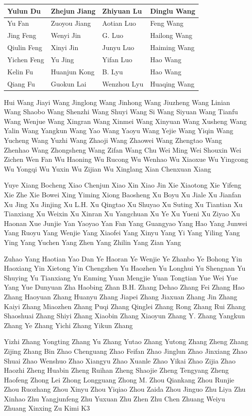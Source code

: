 {\begin{longtable}[]{@{}|l|l|l|l|@{}}
\hline
Yulun Du & Zhejun Jiang & Zhiyuan Lu & Dinglu Wang \\
\hline
Yu Fan & Zuoyou Jiang & Aotian Luo & Feng Wang \\
\hline
Jing Feng & Wenyi Jin & G. Luo & Hailong Wang \\
\hline
Qiulin Feng & Xinyi Jin & Junyu Luo & Haiming Wang \\
\hline
Yichen Feng & Yu Jing & Yifan Luo & Hao Wang \\
\hline
Kelin Fu & Huanjun Kong & B. Lyu & Hao Wang \\
\hline
Qiang Fu & Guokun Lai & Wenzhou Lyu & Huaqing Wang \\
\hline
\end{longtable}
}

Hui Wang Jiayi Wang Jinglong Wang Jinhong Wang Jiuzheng Wang Linian Wang
Shaobo Wang Shenzhi Wang Shuyi Wang Si Wang Siyuan Wang Tianfu Wang
Wenjue Wang Xingran Wang Xinmei Wang Xinyuan Wang Xusheng Wang Yalin
Wang Yangkun Wang Yao Wang Yaoyu Wang Yejie Wang Yiqin Wang Yucheng Wang
Yuzhi Wang Zhaoji Wang Zhaowei Wang Zhengtao Wang Zhenhao Wang
Zhongsheng Wang Zifan Wang Chu Wei Ming Wei Shouxin Wei Zichen Wen Fan
Wu Haoning Wu Rucong Wu Wenhao Wu Xiaoxue Wu Yingcong Wu Yongqi Wu Yuxin
Wu Zijian Wu Xinglang Xian Chenxuan Xiang

Yuye Xiang Bocheng Xiao Chenjun Xiao Xin Xiao Jin Xie Xiaotong Xie
Yifeng Xie Zhe Xie Bowei Xing Yiming Xiong Baosheng Xu Boyu Xu Jiale Xu
Jianfan Xu Jing Xu Jinjing Xu L.H. Xu Qingtao Xu Shuyao Xu Suting Xu
Tiantian Xu Tianxiang Xu Weixin Xu Xinran Xu Yangchuan Xu Ye Xu Yueni Xu
Ziyao Xu Haonan Xue Junjie Yan Yaoyao Yan Fan Yang Guangyao Yang Hao
Yang Junwei Yang Ruoyu Yang Wenjie Yang Xiaofei Yang Xinyu Yang Yi Yang
Yiling Yang Ying Yang Yuchen Yang Zhen Yang Zhilin Yang Zian Yang

Zuhao Yang Haotian Yao Dan Ye Haoran Ye Wenjie Ye Zhanbo Ye Bohong Yin
Haoxiang Yin Xietong Yin Chengzhen Yu Haozhen Yu Longhui Yu Shengnan Yu
Shuying Yu Tianxiang Yu Enming Yuan Mengjie Yuan Tongtian Yue Wei Yue
Yang Yue Dunyuan Zha Haobing Zhan B.H. Zhang Dehao Zhang Fei Zhang Hao
Zhang Haoyuan Zhang Huanyu Zhang Jiapei Zhang Jiaxuan Zhang Jin Zhang
Kaiyi Zhang Miaozhen Zhang Puqi Zhang Qinglei Zhang Rong Zhang Rui Zhang
Shaoshuai Zhang Shiyi Zhang Xiaobin Zhang Xiaoyun Zhang Y. Zhang Yangkun
Zhang Ye Zhang Yichi Zhang Yikun Zhang

Yizhi Zhang Yongting Zhang Yu Zhang Yutao Zhang Yutong Zhang Zheng Zhang
Zijing Zhang Bin Zhao Chenguang Zhao Feifan Zhao Jinglun Zhao Jinxiang
Zhao Shuai Zhao Wenshuo Zhao Xiangyu Zhao Xuanle Zhao Yikai Zhao Zijia
Zhao Haozhi Zheng Huabin Zheng Ruihan Zheng Shaojie Zheng Tengyang Zheng
Haofeng Zhong Lei Zhong Longguang Zhong M. Zhou Qiankang Zhou Runjie
Zhou Ruozhang Zhou Xinyu Zhou Yiqiao Zhou Zaida Zhou Jinguo Zhu Liya Zhu
Xinhao Zhu Yangjunfeng Zhu Yuxuan Zhu Zhen Zhu Chen Zhuang Weiyu Zhuang
Xinxing Zu Kimi K3

